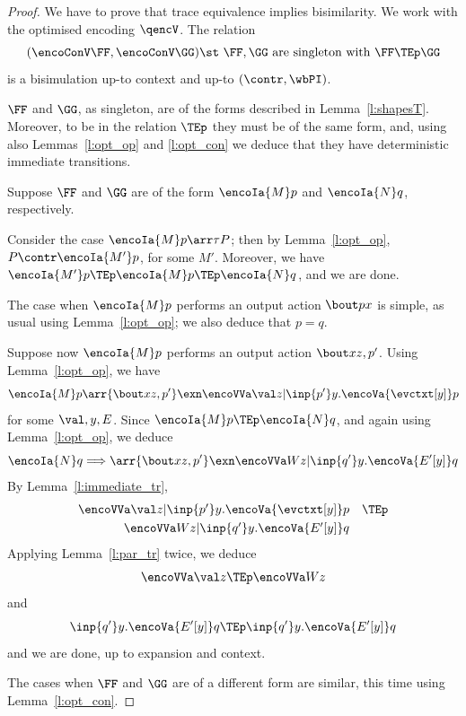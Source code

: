 \begin{proof}
We have to prove that trace equivalence
implies bisimilarity. 
We work with the optimised encoding  $\qencV$.
The relation 
\[ 
(\encoConV \FF,  \encoConV \GG) \st \mbox{ $\FF,\GG$ are singleton
  with $\FF \TEp 
\GG$}
\]
is a bisimulation up-to context and up-to $(\contr,
 \wbPI)$. 


 $\FF$ and $\GG$, as singleton, are of the  forms 
described in Lemma~\ref{l:shapesT}.
Moreover, to be in the relation $ \TEp$ they must be of the same
form, and, using also 
  Lemmas~\ref{l:opt_op}  and 
\ref{l:opt_con} we deduce that they have deterministic immediate
transitions. 

Suppose  $\FF$ and $\GG$ are of the form 
$\encoIa {M} p$ and 
$\encoIa {N} q$, respectively.

Consider the case 
$\encoIa {M} p \arr\tau P$; then by Lemma~\ref{l:opt_op}, 
$P \contr \encoIa {M'} p$, for some $M'$. 
Moreover, we have $ \encoIa {M'} p \TEp \encoIa {M} p \TEp  \encoIa
{N} q$, and we are done. 


The case when $\encoIa {M} p$ performs an output action $\bout px$ is
simple, as usual using  Lemma~\ref{l:opt_op}; we also deduce that
$p=q$. 

Suppose now $\encoIa {M} p$ performs an output action $\bout x{z,p'}$.
Using  Lemma~\ref{l:opt_op}, we have 
\[\encoIa {M} p\arr{\bout x{z,p'}}  
\exn \encoVVa \val z|\inp {p'} y.\encoVa {\evctxt[y]} p
\]
for some $\val,y,E$.
Since $\encoIa {M}p \TEp \encoIa {N}q$, and again using 
 Lemma~\ref{l:opt_op},
we deduce 
\[\encoIa {N} q\Longrightarrow \arr{\bout x{z,p'}}  
\exn \encoVVa W z|\inp {q'} y.\encoVa {E'[y]} q
\]
By Lemma~\ref{l:immediate_tr}, 
\[
\begin{array}{rc}
\encoVVa \val z|\inp {p'} y.\encoVa {\evctxt[y]} p
& \TEp \\[3pt]
\encoVVa W z|\inp {q'} y.\encoVa {E'[y]} q
\end{array}
 \] 
Applying Lemma~\ref{l:par_tr} twice, we deduce 
\[
\encoVVa \val z 
\TEp 
\encoVVa W z
 \]
 and
\[
\inp {q'} y.\encoVa {E'[y]} q \TEp
\inp {q'} y.\encoVa {E'[y]} q
\]
and we are done, up to expansion and context. 


\noindent The cases when
$\FF$ and $\GG$ are of a different form are similar, this time using 
Lemma~\ref{l:opt_con}.
\end{proof}              

   



